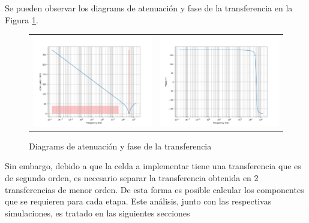 Se pueden observar los diagrams de atenuaci\'on y fase de la transferencia en la Figura \ref{fig:CHEBY_BODE}.
\begin{figure}[H]
    \centering
    \begin{tabular}{c c}
        \includegraphics[scale=0.3]{../EJ2/Recursos/CHEBY_ATT} &
        \includegraphics[scale=0.3]{../EJ2/Recursos/CHEBY_PHASE} \\        
    \end{tabular}
    \caption{Diagrams de atenuaci\'on y fase de la transferencia}
    \label{fig:CHEBY_BODE}
\end{figure}

Sin embargo, debido a que la celda a implementar tiene una transferencia que es de segundo orden, es necesario separar la transferencia obtenida en 2 transferencias de menor orden. De esta forma es posible calcular los componentes que se requieren para cada etapa. Este an\'alisis, junto con las respectivas simulaciones, es tratado en las siguientes secciones

